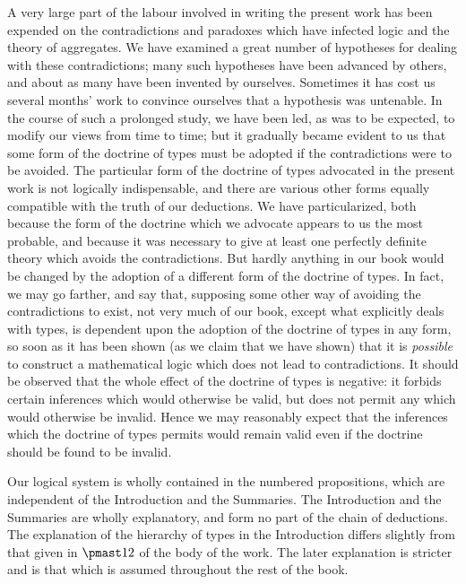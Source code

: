\documentclass[letterpaper,12pt,openany,leqno]{book}
\newcommand{\pagefirst}[1]{\marginnote[\boxed{\text{#1}}]{\boxed{\text{#1}}}}
\begin{document}
A very large part of the labour involved in writing the present work has been expended on the contradictions and paradoxes which have infected logic and the theory of aggregates. We have examined a great number of hypotheses for dealing with these contradictions; many such hypotheses have been advanced by others, and about as many have been invented by ourselves. Sometimes it has cost us several months' work to convince ourselves that a hypothesis was untenable. In the course of such a prolonged study, we have been led, as was to be expected, to modify our views from time to time; but it gradually became evident to us that some form of the doctrine of types must be adopted if the contradictions were to be avoided. The particular form of the doctrine of types advocated in the present work is not logically indispensable, and there are various other forms equally compatible with the truth of our deductions. We have particularized, both because the form of the doctrine which we advocate appears to us the most probable, and because it was necessary to give at least one perfectly definite theory which avoids the contradictions. But hardly anything in our book would be changed by the adoption of a different form of the doctrine of types. In fact, we may go farther, and say that, supposing some other way of avoiding the contradictions to exist, not very much of our book, except what explicitly deals with types, is dependent upon the adoption of the doctrine of types in any form, so soon as it has been shown (as we claim \pagefirst{viii} that we have shown) that it is \textit{possible} to construct a mathematical logic which does not lead to contradictions. It should be observed that the whole effect of the doctrine of types is negative: it forbids certain inferences which would otherwise be valid, but does not permit any which would otherwise be invalid. Hence we may reasonably expect that the inferences which the doctrine of types permits would remain valid even if the doctrine should be found to be invalid.

Our logical system is wholly contained in the numbered propositions, which are independent of the Introduction and the Summaries. The Introduction and the Summaries are wholly explanatory, and form no part of the chain of deductions. The explanation of the hierarchy of types in the Introduction differs slightly from that given in $\pmast12$ of the body of the work. The later explanation is stricter and is that which is assumed throughout the rest of the book.
\end{document}
